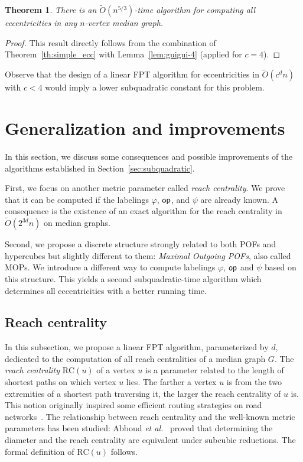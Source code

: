 \documentclass{article}
\newtheorem{theorem}{Theorem}
\newcommand{\opp}{\mbox{\textsf{op}}}
\newcommand{\rc}{\mbox{RC}}
\begin{document}
\begin{theorem}\label{thm:guigui-5}
There is an $\tilde{O}(n^{5/3})$-time algorithm for computing all eccentricities in any $n$-vertex median graph.
\end{theorem}
\begin{proof}
This result directly follows from the combination of Theorem~\ref{th:simple_ecc} with Lemma~\ref{lem:guigui-4} (applied for $c = 4$).
\end{proof}

Observe that the design of a linear FPT algorithm for eccentricities in $\tilde{O}(c^dn)$ with $c < 4$ would imply a lower subquadratic constant for this problem.

\section{Generalization and improvements} \label{sec:discussion}

In this section, we discuss some consequences and possible improvements of the algorithms established in Section~\ref{sec:subquadratic}. 

First, we focus on another metric parameter called \textit{reach centrality}. We prove that it can be computed if the labelings $\varphi$, $\opp$, and $\psi$ are already known. A consequence is the existence of an exact algorithm for the reach centrality in $\tilde{O}(2^{3d}n)$ on median graphs. 

Second, we propose a discrete structure strongly related to both POFs and hypercubes but slightly different to them: \textit{Maximal Outgoing POFs}, also called MOPs. We introduce a different way to compute labelings $\varphi$, $\opp$ and $\psi$ based on this structure. This yields a second subquadratic-time algorithm which determines all eccentricities with a better running time.

\subsection{Reach centrality} \label{subsec:reach_centrality}

In this subsection, we propose a linear FPT algorithm, parameterized by $d$, dedicated to the computation of all reach centralities of a median graph $G$. The \textit{reach centrality} $\rc(u)$ of a vertex $u$ is a parameter related to the length of shortest paths on which vertex $u$ lies. The farther a vertex $u$ is from the two extremities of a shortest path traversing it, the larger the reach centrality of $u$ is. This notion originally inspired some efficient routing strategies on road networks~\cite{Gu04}. The relationship between reach centrality and the well-known metric parameters has been studied: Abboud {\em et al.}~\cite{AbGrWi15} proved that determining the diameter and the reach centrality are equivalent under subcubic reductions. The formal definition of $\rc(u)$ follows.
\end{document}
